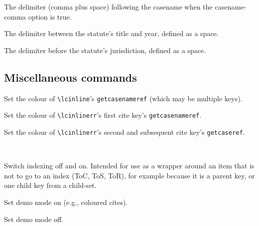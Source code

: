 
The delimiter (comma plus space) following the casename when the casename-comma option is true.
\bigskip



The delimiter between the statute's title and year, defined as a space.
\bigskip


The delimiter before the statute's jurisdiction, defined as a space.



\subsection{Miscellaneous commands}



Set the colour of \texttt{\textbackslash lcinline}'s \colorbox{red!10}{\texttt{getcasenameref}} (which may be multiple keys).
\bigskip
	

Set the colour of \texttt{\textbackslash lcinlinerr}'s first cite key's \colorbox{red!10}{\texttt{getcasenameref}}. %
\bigskip
	

Set the colour of \texttt{\textbackslash lcinlinerr}'s second and subsequent cite key's \colorbox{yellow!20}{\texttt{getcaseref}}.
\bigskip

 \\

\label{indexoffon}Switch indexing off and on. Intended for use as a wrapper around an item that is not to go to an index (ToC, ToS, ToR), for example because it is a parent key, or one child key from a child-set.
\bigskip


	


Set demo mode on (e.g., coloured cites).
\bigskip


Set demo mode off.
\bigskip

	
	
